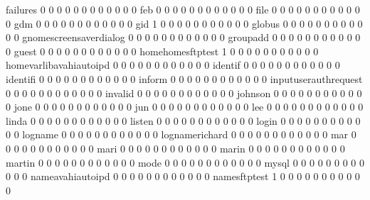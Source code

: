 \documentclass[compress,8pt]{beamer}
\begin{document}
\begin{frame}
\begin{Schunk}
  failures                                  0  0  0  0  0  0  0  0  0  0  0  0
  feb                                       0  0  0  0  0  0  0  0  0  0  0  0
  file                                      0  0  0  0  0  0  0  0  0  0  0  0
  gdm                                       0  0  0  0  0  0  0  0  0  0  0  0
  gid                                       1  0  0  0  0  0  0  0  0  0  0  0
  globus                                    0  0  0  0  0  0  0  0  0  0  0  0
  gnomescreensaverdialog                    0  0  0  0  0  0  0  0  0  0  0  0
  groupadd                                  0  0  0  0  0  0  0  0  0  0  0  0
  guest                                     0  0  0  0  0  0  0  0  0  0  0  0
  homehomesftptest                          1  0  0  0  0  0  0  0  0  0  0  0
  homevarlibavahiautoipd                    0  0  0  0  0  0  0  0  0  0  0  0
  identif                                   0  0  0  0  0  0  0  0  0  0  0  0
  identifi                                  0  0  0  0  0  0  0  0  0  0  0  0
  inform                                    0  0  0  0  0  0  0  0  0  0  0  0
  inputuserauthrequest                      0  0  0  0  0  0  0  0  0  0  0  0
  invalid                                   0  0  0  0  0  0  0  0  0  0  0  0
  johnson                                   0  0  0  0  0  0  0  0  0  0  0  0
  jone                                      0  0  0  0  0  0  0  0  0  0  0  0
  jun                                       0  0  0  0  0  0  0  0  0  0  0  0
  lee                                       0  0  0  0  0  0  0  0  0  0  0  0
  linda                                     0  0  0  0  0  0  0  0  0  0  0  0
  listen                                    0  0  0  0  0  0  0  0  0  0  0  0
  login                                     0  0  0  0  0  0  0  0  0  0  0  0
  logname                                   0  0  0  0  0  0  0  0  0  0  0  0
  lognamerichard                            0  0  0  0  0  0  0  0  0  0  0  0
  mar                                       0  0  0  0  0  0  0  0  0  0  0  0
  mari                                      0  0  0  0  0  0  0  0  0  0  0  0
  marin                                     0  0  0  0  0  0  0  0  0  0  0  0
  martin                                    0  0  0  0  0  0  0  0  0  0  0  0
  mode                                      0  0  0  0  0  0  0  0  0  0  0  0
  mysql                                     0  0  0  0  0  0  0  0  0  0  0  0
  nameavahiautoipd                          0  0  0  0  0  0  0  0  0  0  0  0
  namesftptest                              1  0  0  0  0  0  0  0  0  0  0  0

\end{Schunk}
\end{frame}
\end{document}
